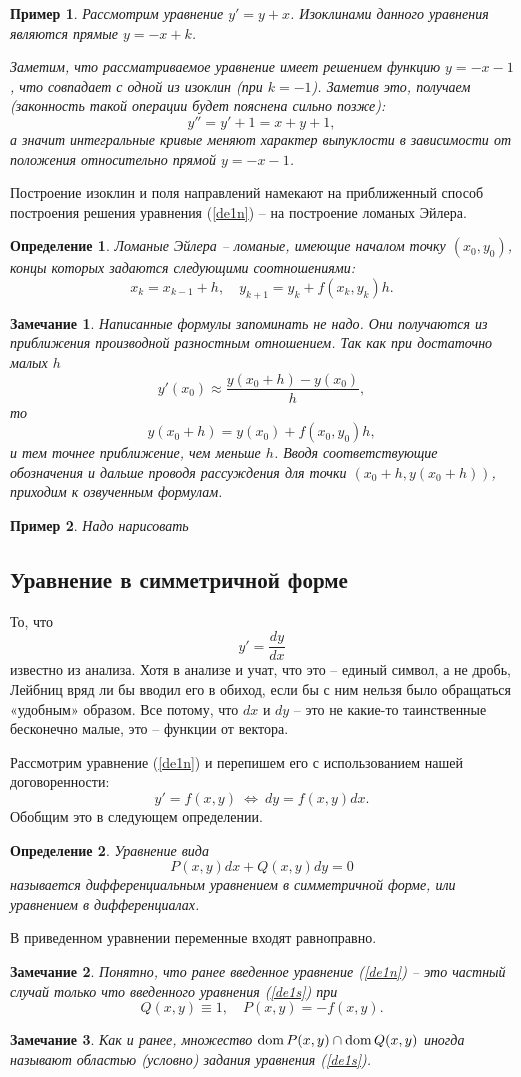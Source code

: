 \documentclass[a4paper,14pt]{extarticle}
\def\dom{{\rm dom\,}}
\newtheorem{definition}{Определение}[subsection]
\newtheorem{example}{Пример}[subsection]
\newtheorem{remark}{Замечание}[subsection]
\newcommand{\be}{\begin{equation}}
\newcommand{\ee}{\end{equation}}
\newcommand{\la}{\label}
\begin{document}
\begin{example}
Рассмотрим уравнение $y' = y + x$. Изоклинами данного уравнения являются прямые $y = -x + k$.

Заметим, что рассматриваемое уравнение имеет решением функцию $y = -x-1$, что совпадает с одной из изоклин (при $k = -1$). Заметив это, получаем (законность такой операции будет пояснена сильно позже):
$$
y'' = y' + 1 = x + y + 1,
$$
а значит интегральные кривые меняют характер выпуклости в зависимости от положения относительно прямой $y = -x - 1$. 
\end{example}
Построение изоклин и поля направлений намекают на приближенный способ построения решения уравнения (\ref{de1n}) -- на построение ломаных Эйлера. 
\begin{definition}
Ломаные Эйлера -- ломаные, имеющие началом точку $(x_0, y_0)$, концы которых задаются следующими соотношениями:
$$
x_{k} = x_{k - 1} + h, \quad y_{k+1} = y_k + f(x_k, y_k)h.
$$	
\end{definition}
\begin{remark}
Написанные формулы запоминать не надо. Они получаются из приближения производной разностным отношением. Так как при достаточно малых $h$
$$
y'(x_0) \approx \frac{y(x_0 + h) - y(x_0)}{h},
$$	
то
$$
y(x_0 + h) = y(x_0) + f(x_0, y_0)h,
$$
и тем точнее приближение, чем меньше $h$. Вводя соответствующие обозначения и дальше проводя рассуждения для точки $(x_0 + h, y(x_0+ h))$, приходим к озвученным формулам.
\end{remark}
\begin{example}
Надо нарисовать	
\end{example}
\subsection{Уравнение в симметричной форме}
То, что
$$
y' = \frac{dy}{dx}
$$
известно из анализа. Хотя в анализе и учат, что это -- единый символ, а не дробь, Лейбниц вряд ли бы вводил его в обиход, если бы с ним нельзя было обращаться «удобным» образом. Все потому, что $dx$ и $dy$ -- это не какие-то таинственные бесконечно малые, это -- функции от вектора. 

Рассмотрим уравнение (\ref{de1n}) и перепишем его с использованием нашей договоренности:
$$
y' = f(x, y) \ \Leftrightarrow \ dy = f(x,y)dx.
$$
Обобщим это в следующем определении.
\begin{definition}
Уравнение вида
\be\la{de1s}
P(x, y)dx + Q(x, y)dy = 0
\ee
называется дифференциальным уравнением в симметричной форме, или уравнением в дифференциалах.
\end{definition}
В приведенном уравнении переменные входят равноправно.
\begin{remark}
Понятно, что ранее введенное уравнение (\ref{de1n}) -- это частный случай только что введенного уравнения (\ref{de1s}) при 
$$
Q(x, y) \equiv 1, \quad P(x, y) = -f(x, y).
$$
\end{remark}
\begin{remark}
Как и ранее, множество $\dom P(x, y) \cap \dom Q(x,y)$ иногда называют областью (условно) задания уравнения (\ref{de1s}).
\end{remark}
\end{document}
